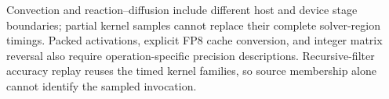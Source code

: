 Convection and reaction--diffusion include different host and device stage boundaries; partial kernel samples cannot replace their complete solver-region timings. Packed activations, explicit FP8 cache conversion, and integer matrix reversal also require operation-specific precision descriptions. Recursive-filter accuracy replay reuses the timed kernel families, so source membership alone cannot identify the sampled invocation.
